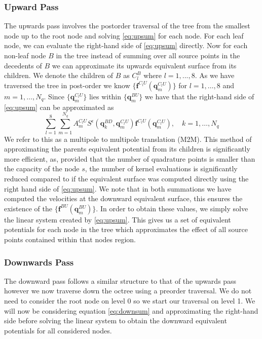 \subsubsection{Upward Pass}
The upwards pass involves the postorder traversal of the tree from the smallest node up to the root node and solving \cref{eq:upsum} for each node. For each leaf node, we can evaluate the right-hand side of \cref{eq:upsum} directly. Now for each non-leaf node $B$ in the tree instead of summing over all source points in the decedents of $B$ we can approximate its upwards equivalent surface from its children. We denote the children of $B$ as $C_l^B$ where $l=1,...,8$. As we have traversed the tree in post-order we know $\{\bm{f}^{C_l U}(\bm{q}^{C_lU}_m)\}$ for $l=1,\dots,8$ and $m=1,\dots,N_q$. Since $\{\bm{q}^{C_lU}_m\}$ lies within $\{\bm{q}^{BU}_m\}$ we have that the right-hand side of \cref{eq:upsum} can be approximated as 
\begin{equation}
\label{eq:M2M}
    \sum_{l=1}^{8} \sum_{m=1}^{N_{q}} A_{m}^{C_{l} U} S^\epsilon\left(\bm{q}_{k}^{B D}, \bm{q}_{m}^{C_{l} U}\right) \bm{f}^{C_{l} U}\left(\bm{q}_{m}^{C_{l} U}\right), \quad k=1,\dots,N_q
\end{equation}
We refer to this as a multipole to multipole translation (M2M). This method of approximating the parents equivalent potential from its children is significantly more efficient, as, provided that the number of quadrature points is smaller than the capacity of the node $s$, the number of kernel evaluations is significantly reduced compared to if the equivalent surface was computed directly using the right hand side of \cref{eq:upsum}. We note that in both summations we have computed the velocities at the downward equivalent surface, this ensures the existence of the $\{\bm{f}^{BU}(\bm{q}^{BU}_m)\}$. In order to obtain these values, we simply solve the linear system created by \cref{eq:upsum}. This gives us a set of equivalent potentials for each node in the tree which approximates the effect of all source points contained within that nodes region. 

\subsubsection{Downwards Pass}
The downward pass follows a similar structure to that of the upwards pass however we now traverse down the octree using a preorder traversal. We do not need to consider the root node on level 0 so we start our traversal on level 1. We will now be considering equation \cref{eq:downsum} and approximating the right-hand side before solving the linear system to obtain the downward equivalent potentials for all considered nodes. 

